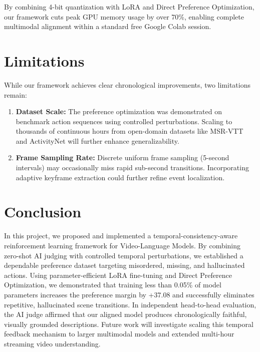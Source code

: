 \documentclass[journal]{IEEEtai}
\begin{document}
By combining 4-bit quantization with LoRA and Direct Preference Optimization, our framework cuts peak GPU memory usage by over 70\%, enabling complete multimodal alignment within a standard free Google Colab session.

\section{Limitations}
While our framework achieves clear chronological improvements, two limitations remain:
\begin{enumerate}
    \item \textbf{Dataset Scale:} The preference optimization was demonstrated on benchmark action sequences using controlled perturbations. Scaling to thousands of continuous hours from open-domain datasets like MSR-VTT and ActivityNet will further enhance generalizability.
    \item \textbf{Frame Sampling Rate:} Discrete uniform frame sampling (5-second intervals) may occasionally miss rapid sub-second transitions. Incorporating adaptive keyframe extraction could further refine event localization.
\end{enumerate}

\section{Conclusion}
In this project, we proposed and implemented a temporal-consistency-aware reinforcement learning framework for Video-Language Models. By combining zero-shot AI judging with controlled temporal perturbations, we established a dependable preference dataset targeting misordered, missing, and hallucinated actions. Using parameter-efficient LoRA fine-tuning and Direct Preference Optimization, we demonstrated that training less than 0.05\% of model parameters increases the preference margin by +37.08 and successfully eliminates repetitive, hallucinated scene transitions. In independent head-to-head evaluation, the AI judge affirmed that our aligned model produces chronologically faithful, visually grounded descriptions. Future work will investigate scaling this temporal feedback mechanism to larger multimodal models and extended multi-hour streaming video understanding.
\end{document}
